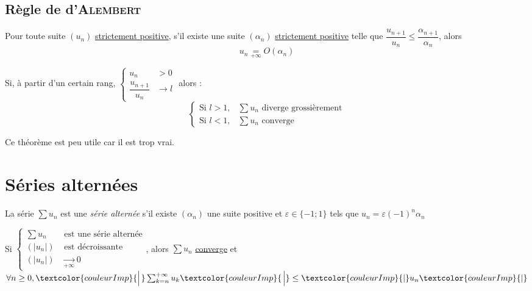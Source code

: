 \documentclass[11pt,a4paper,fleqn,pdftex]{report}
\begin{document}
\subsection{Règle de d'\textsc{Alembert}} %
\label{sub:regle_de_d_alembert}
\begin{lemme}
    Pour toute suite $(u_n)$ \uline{strictement positive}, s'il existe une suite $(\alpha_n)$ \uline{strictement positive} telle que $\dfrac{u_{n+1}}{u_n}\le \dfrac{\alpha_{n+1}}{\alpha_n}$, alors 
    \begin{equation}
    u_n \underset{+\infty}{=} O(\alpha_n)
    \end{equation}
\end{lemme}
\begin{itheorem}\label{th:Regle_de_dAlembert}
    Si, à partir d'un certain rang, $\left\lbrace
    \begin{aligned}
        u_n &> 0    \\
        \dfrac{u_{n+1}}{u_n} &\to l
    \end{aligned}
    \right. $ alors :
    \begin{equation}
    \left\lbrace
    \begin{aligned}
        \text{Si } l >1, & \sum u_n \text{ diverge grossièrement}   \\
        \text{Si } l <1, & \sum u_n \text{ converge} 
    \end{aligned}
    \right.
    \end{equation}
\end{itheorem}


Ce théorème est peu utile car il est \og{}trop vrai\fg{}.
\section{Séries alternées} %
\label{sec:series_alternees}
\begin{dfn}
    La série $\sum u_n$ est une \emph{série alternée} s'il existe $(\alpha_n)$ une suite positive et $\varepsilon \in \lbrace -1 ; 1 \rbrace$ tels que $u_n = \varepsilon (-1)^n\alpha_n$
\end{dfn}
\begin{itheorem}
    Si $\left\lbrace \begin{aligned} \sum u_n &\text{ est une série alternée}\\ (|u_n|) &\text{ est décroissante} \\ (|u_n|) &\xrightarrow[+\infty]{} 0 \end{aligned}\right.$, alors $\sum u_n$ \uline{converge} et $\forall n \ge 0, \textcolor{couleurImp}{\left| \vphantom{\sum_{k=n}^{+\infty}} \right. } \sum_{k=n}^{+\infty}u_k \textcolor{couleurImp}{\left. \vphantom{\sum_{k=n}^{+\infty}} \right| } \le \textcolor{couleurImp}{|} u_n\textcolor{couleurImp}{|}$
\end{itheorem}
\end{document}
